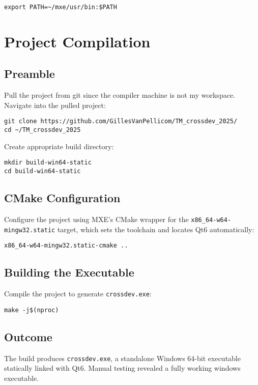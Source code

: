 \documentclass{report}
\begin{document}
\begin{verbatim}
export PATH=~/mxe/usr/bin:$PATH
\end{verbatim}

\chapter{Project Compilation}

\section{Preamble}

Pull the project from git since the compiler machine is not my workspace. Navigate into the pulled project:

\begin{verbatim}
git clone https://github.com/GillesVanPellicom/TM_crossdev_2025/
cd ~/TM_crossdev_2025
\end{verbatim}
Create appropriate build directory:
\begin{verbatim}
mkdir build-win64-static
cd build-win64-static
\end{verbatim}

\section{CMake Configuration}

Configure the project using MXE's CMake wrapper for the \texttt{x86\_64-w64-mingw32.static} target, which sets the toolchain and locates Qt6 automatically:

\begin{verbatim}
x86_64-w64-mingw32.static-cmake ..
\end{verbatim}

\section{Building the Executable}

Compile the project to generate \texttt{crossdev.exe}:

\begin{verbatim}
make -j$(nproc)
\end{verbatim}

\section{Outcome}

The build produces \texttt{crossdev.exe}, a standalone Windows 64-bit executable statically linked with Qt6. Manual testing revealed a fully working windows executable.
\end{document}
